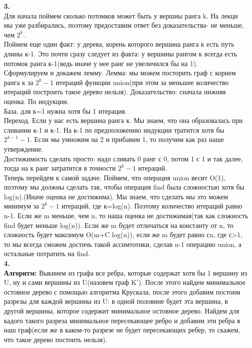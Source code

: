 \documentclass[a4paper,12pt]{article}
\begin{document}
\textbf{3.}\\
Для начала поймем сколько потомков может быть у вершиы ранга k. На лекци мы уже разбирались, поэтому предоставим ответ без доказательства- не меньше, чем $2^k$.\\
Поймем еще один факт: у дерева, корень которого вершина ранга к есть путь длины к-1. Это почти сразу следует из факта: у вершины рангом к всегда есть потомок ранга к-1(ведь иначе у нее ранг не увеличился бы на 1).\\
Сформулируем и докажем лемму. Лемма: мы можем посторить граф с корнем ранга к за $2^k-1$ итераций функции union(при этом за  меньшее количество итераций построить такое дерево нельзя). Доказательство: сначала нижняя оценка. По индукции.\\
База. для к=1 нужна хотя бы 1 итерация.\\
Переход. Если у нас есть вершина ранга к. Мы знаем, что она образовалась при сливании к-1 и к-1. На к-1 по предположению индукции тратится  хотя бы $2^{k-1}-1$. Если мы умножим на 2 и прибавим 1, то получим как раз наше утверждение.\\
Достижимость сделать просто: надо сливать 0 ранг с 0, потом 1 с 1 и так далее, тогда на к ранг затратится в точности  $2^{k}-1$ итераций.\\
Теперь перейдем к самой задаче. Поймем, что операция union весит O(1), поэтому мы должны сделать так, чтобы операция find была сложностью хотя бы log(n).(Иначе оценка не достижима). Мы знаем, что сделать мы это можем минимум за $2^{k}-1$ итераций, где к=log(n). Поэтому количество итераций равно n-1. Если же m меньше, чем n, то наша оценка не достижимая(так как сложность find будет меньше log(n)). Если же m будет отличаться на константу от n, то сложность будет максимум O(m+C log(n)), если же m будет равно сn, где с>1, то мы всегда сможем достичь такой ассимтотики, сделав n-1 операцию union,  а остальные потратить на find.\\
\textbf{4.}\\
\textbf{Алгоритм:} Выкинем из графа все ребра, которые содержат хотя бы 1 вершину из U, ну и сами вершины из U(назовем граф K'). После этого найдем минимальное остовное дерево с помощью алгоритма Крускала, после этого добавим постоим разрезы для каждой вершины из U: в одной половине будет эта вершина, в другой вершины, которое содержит минимальное остовное дерево. Найдем для кадого такого разреза минимальное пересекающее ребро и добавим эти ребра в наш граф(если же в каком-то разрезе не будет пересекающих ребер, то скажем, что такое дерево постоить нельзя).\\
\end{document}
